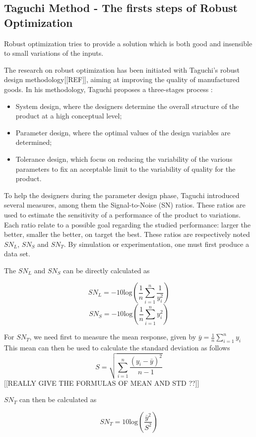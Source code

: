 \subsection{Taguchi Method - The firsts steps of Robust Optimization }

Robust optimization tries to provide a solution which is both good and insensible to small variations of the inputs.

The research on robust optimization has been initiated with Taguchi's robust design methodology[[REF]], aiming at improving the quality of manufactured goods.
In his methodology, Taguchi proposes a three-stages process :
\begin{itemize}
\item System design, where the designers determine the overall structure of the product at a high conceptual level;
\item Parameter design, where the optimal values of the design variables are determined;
\item Tolerance design, which focus on reducing the variability of the  various parameters to fix an acceptable limit to the variability of quality for the product.
\end{itemize}

To help the designers during the parameter design phase, Taguchi introduced several measures, among them the Signal-to-Noise (SN) ratios. These ratios are used to estimate the sensitivity of a performance of the product to variations. Each ratio relate to a possible goal regarding the studied performance: larger the better, smaller the better, on target the best. These ratios are respectively noted $SN_L$, $SN_S$ and $SN_T$.
By simulation or experimentation, one must first produce a data set.

The $SN_L$ and $SN_S$ can be directly calculated as

\[SN_L = -10\text{log}\left( \frac{1}{n} \sum_{i=1}^n \frac{1}{y_i^2} \right)\]
\[SN_S = -10\text{log}\left( \frac{1}{n} \sum_{i=1}^n y_i^2 \right)\]

For $SN_T$, we need first to measure the mean response, given by $\bar{y} = \frac{1}{n}\sum_{i=1}^n y_i$
This mean can then be used to calculate the standard deviation as follows 
\[S = \sqrt{\sum_{i=1}^n \frac{(y_i - \bar{y})^2}{n-1}}\]
[[REALLY GIVE THE FORMULAS OF MEAN AND STD ??]]

 $SN_T$ can then be calculated as
 
 \[ SN_T = 10\text{log}\left(\frac{\bar{y}^2}{S^2}\right) \]
 
